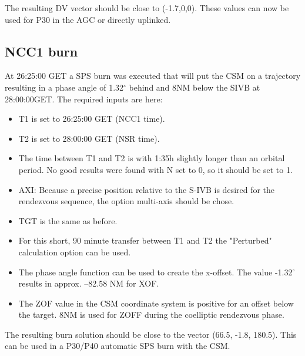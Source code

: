 \documentclass[11pt]{article} %
\begin{document}
The resulting DV vector should be close to (-1.7,0,0). These values can now be used for P30 in the AGC or directly uplinked.\\

\subsection{NCC1 burn}

At 26:25:00 GET a SPS burn was executed that will put the CSM on a trajectory resulting in a phase angle of 1.32$^{\circ}$ behind and 8NM below the SIVB at 28:00:00GET. The required inputs are here:

\begin{itemize}
	\item{T1 is set to 26:25:00 GET (NCC1 time).}
	\item{T2 is set to 28:00:00 GET (NSR time).}
	\item{The time between T1 and T2 is with 1:35h slightly longer than an orbital period. No good results were found with N set to 0, so it should be set to 1.}
	\item{AXI: Because a precise position relative to the S-IVB is desired for the rendezvous sequence, the option multi-axis should be chose.}
	\item{TGT is  the same as before.}
	\item{For this short, 90 minute transfer between T1 and T2 the "Perturbed" calculation option can be used.}
	\item{The phase angle function can be used to create the x-offset. The value -1.32$^{\circ}$ results in approx. --82.58 NM for XOF.}
	\item{The ZOF value in the CSM coordinate system is positive for an offset below the target. 8NM is used for ZOFF during the coelliptic rendezvous phase.}
\end{itemize}

The resulting burn solution should be close to the vector (66.5, -1.8, 180.5). This can be used in a P30/P40 automatic SPS burn with the CSM.


\end{document}
